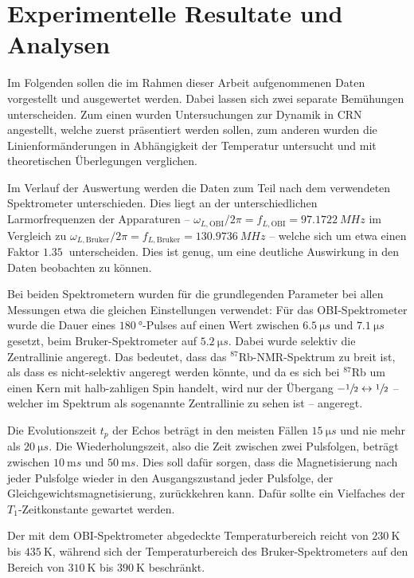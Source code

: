 \chapter{Experimentelle Resultate und Analysen}
\label{chapter:experiment}

Im Folgenden sollen die im Rahmen dieser Arbeit aufgenommenen Daten vorgestellt und ausgewertet werden. Dabei lassen sich zwei separate Bemühungen unterscheiden. Zum einen wurden Untersuchungen zur Dynamik in CRN angestellt, welche zuerst präsentiert werden sollen, zum anderen wurden die Linienformänderungen in Abhängigkeit der Temperatur untersucht und mit theoretischen Überlegungen verglichen.

Im Verlauf der Auswertung werden die Daten zum Teil nach dem verwendeten Spektrometer unterschieden. Dies liegt an der unterschiedlichen Larmorfrequenzen der Apparaturen -- $\omega_{L, \text{OBI}} / 2\pi = f_{L, \text{OBI}} = \SI{97.1722}{MHz}$ im Vergleich zu $\omega_{L, \text{Bruker}} / 2\pi = f_{L, \text{Bruker}} = \SI{130.9736}{MHz}$ -- welche sich um etwa einen Faktor $\SI{1.35}{}$ unterscheiden. Dies ist genug, um eine deutliche Auswirkung in den Daten beobachten zu können.

Bei beiden Spektrometern wurden für die grundlegenden Parameter bei allen Messungen etwa die gleichen Einstellungen verwendet: Für das OBI-Spektrometer wurde die Dauer eines $\SI{180}{\degree}$-Pulses auf einen Wert zwischen $\SI{6.5}{\micro s}$ und $\SI{7.1}{\micro s}$ gesetzt, beim Bruker-Spektrometer auf $\SI{5.2}{\micro s}$. Dabei wurde selektiv die Zentrallinie angeregt. Das bedeutet, dass das $^\text{87}$Rb-NMR-Spektrum zu breit ist, als dass es nicht-selektiv angeregt werden könnte, und da es sich bei $^\text{87}$Rb um einen Kern mit halb-zahligen Spin handelt, wird nur der Übergang $-\sfrac{1}{2} \leftrightarrow \sfrac{1}{2}$ -- welcher im Spektrum als sogenannte Zentrallinie zu sehen ist -- angeregt.

Die Evolutionszeit $t_p$ der Echos beträgt in den meisten Fällen $\SI{15}{\micro s}$ und nie mehr als $\SI{20}{\micro s}$. Die Wiederholungszeit, also die Zeit zwischen zwei Pulsfolgen, beträgt zwischen $\SI{10}{\milli s}$ und $\SI{50}{\milli s}$. Dies soll dafür sorgen, dass die Magnetisierung nach jeder Pulsfolge wieder in den Ausgangszustand jeder Pulsfolge, der Gleichgewichtsmagnetisierung, zurückkehren kann. Dafür sollte ein Vielfaches der $T_1$-Zeitkonstante gewartet werden.

Der mit dem OBI-Spektrometer abgedeckte Temperaturbereich reicht von $\SI{230}{\kelvin}$ bis $\SI{435}{\kelvin}$, während sich der Temperaturbereich des Bruker-Spektrometers auf den Bereich von $\SI{310}{\kelvin}$ bis $\SI{390}{\kelvin}$ beschränkt.

